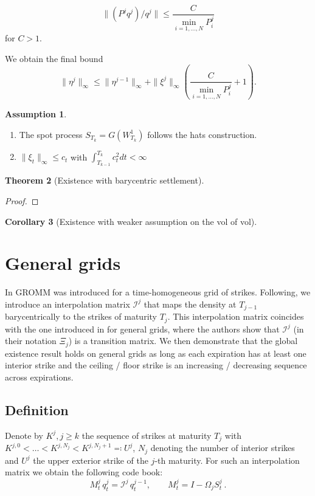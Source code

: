 \documentclass[11pt]{article}
\theoremstyle{plain}
\newtheorem{theorem}{Theorem}[section]
\newtheorem{corollary}[theorem]{Corollary}
\theoremstyle{definition}
\newtheorem{assumption}[theorem]{Assumption}
\theoremstyle{remark}
\begin{document}
$$\| (P^j q^j) / q^j \| \leq \frac{C}{\min_{i=1, \dots, N} P^j_i } $$ 
for $C > 1$. 

We obtain the final bound 
$$
\|\eta^j\|_\infty \leq \|\eta^{j-1}\|_\infty + \| \xi^j\|_\infty \left(\frac{C}{\min_{i=1, \dots, N} P^j_i } +  1 \right) . 
$$

\begin{assumption}  
\begin{enumerate}
  \item The spot process $S_{T_k} = G(W_{T_k}^1)$ follows the hats construction. 
  \item $\|\xi_t\|_\infty \leq c_t$ with $\int_{T_{k-1}}^{T_{k}} c_t^2 dt < \infty$
\end{enumerate}
\end{assumption}

\begin{theorem}[Existence with barycentric settlement]
\end{theorem}
\begin{proof}
\end{proof}

\begin{corollary}[Existence with weaker assumption on the vol of vol]
  
\end{corollary}


\section{General grids}
In \cite{GROMM2026} GROMM was introduced for a time-homogeneous grid of strikes. Following, we introduce an interpolation matrix $\mathcal{I}^j$ that maps the density at $T_{j-1}$ barycentrically to the strikes of maturity $T_j$. This interpolation matrix coincides with the one introduced in \cite{DLV} for general grids, where the authors show that $\mathcal{I}^j$ (in their notation $\Xi_j$) is a transition matrix. We then demonstrate that the global existence result holds on general grids as long as each expiration has at least one interior strike and the ceiling / floor strike is an increasing / decreasing sequence across expirations. 

\subsection{Definition}
Denote by $K^j, j \geq k$ the sequence of strikes at maturity $T_j$ with $K^{j, 0} < \dots < K^{j, N_j} < K^{j, N_j+1} \eqqcolon U^{j}$, $N_j$ denoting the number of interior strikes and $U^j$ the upper exterior strike of the $j$-th maturity. For such an interpolation matrix we obtain the following code book: 
\begin{equation}\label{eq:codebook}
  M^j_t\,q^j_t=\mathcal{I}^j\,q^{j-1}_t,\qquad M^j_t=I-\Omega_jS^j_t  \ . 
\end{equation}
\end{document}
